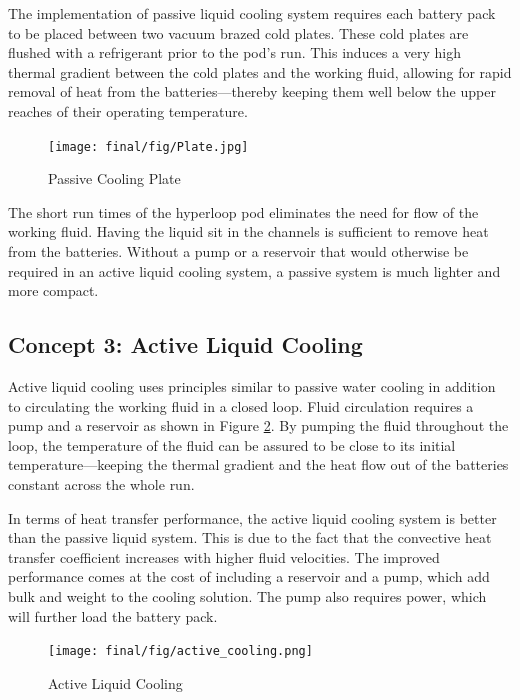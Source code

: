 \documentclass[11pt]{article}
\numberwithin{equation}{subsection} %
\begin{document}
The implementation of passive liquid cooling system requires each battery pack to be placed between two vacuum brazed cold plates. These cold plates are flushed with a refrigerant prior to the pod's run. This induces a very high thermal gradient between the cold plates and the working fluid, allowing for rapid removal of heat from the batteries---thereby keeping them well below the upper reaches of their operating temperature.

\begin{figure}[!htb]
 \centering
	\texttt{[image: final/fig/Plate.jpg]}
    \caption{Passive Cooling Plate}
    \label{fig:Passive Cooling Plate}
\end{figure}

The short run times of the hyperloop pod eliminates the need for flow of the working fluid. Having the liquid sit in the channels is sufficient to remove heat from the batteries. Without a pump or a reservoir that would otherwise be required in an active liquid cooling system, a passive system is much lighter and more compact.

\subsection{Concept 3: Active Liquid Cooling}
Active liquid cooling uses principles similar to passive water cooling in addition to circulating the working fluid in a closed loop. Fluid circulation requires a pump and a reservoir as shown in Figure \ref{fig:Active Liquid Cooling}. By pumping the fluid throughout the loop, the temperature of the fluid can be assured to be close to its initial temperature---keeping the thermal gradient and the heat flow out of the batteries constant across the whole run.

In terms of heat transfer performance, the active liquid cooling system is better than the passive liquid system. This is due to the fact that the convective heat transfer coefficient increases with higher fluid velocities. The improved performance comes at the cost of including a reservoir and a pump, which add bulk and weight to the cooling solution. The pump also requires power, which will further load the battery pack. 

\begin{figure}[!htb]
 \centering
	\texttt{[image: final/fig/active\_cooling.png]}
    \caption{Active Liquid Cooling}
    \label{fig:Active Liquid Cooling}
\end{figure}
\end{document}
